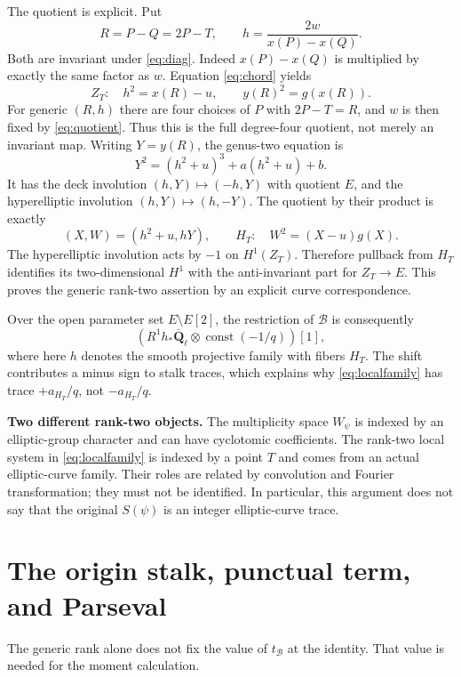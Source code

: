 \documentclass[11pt,a4paper]{article}
\numberwithin{equation}{section}
\newcommand{\Q}{\overline{\mathbf Q}_{\ell}}
\newcommand{\const}{\operatorname{const}}
\newcommand{\B}{\mathcal B}
\begin{document}
The quotient is explicit. Put
\begin{equation}\label{eq:quotient}
 R=P-Q=2P-T,\qquad h=\frac{2w}{x(P)-x(Q)}.
\end{equation}
Both are invariant under \eqref{eq:diag}. Indeed $x(P)-x(Q)$ is multiplied by exactly the same factor as $w$. Equation \eqref{eq:chord} yields
\begin{equation}\label{eq:genus2}
 Z_T:\quad h^2=x(R)-u,\qquad y(R)^2=g(x(R)).
\end{equation}
For generic $(R,h)$ there are four choices of $P$ with $2P-T=R$, and $w$ is then fixed by \eqref{eq:quotient}. Thus this is the full degree-four quotient, not merely an invariant map. Writing $Y=y(R)$, the genus-two equation is
\begin{equation}
 Y^2=(h^2+u)^3+a(h^2+u)+b.
\end{equation}
It has the deck involution $(h,Y)\mapsto(-h,Y)$ with quotient $E$, and the hyperelliptic involution $(h,Y)\mapsto(h,-Y)$. The quotient by their product is exactly
\begin{equation}
 (X,W)=(h^2+u,hY),\qquad H_T:\quad W^2=(X-u)g(X).
\end{equation}
The hyperelliptic involution acts by $-1$ on $H^1(Z_T)$. Therefore pullback from $H_T$ identifies its two-dimensional $H^1$ with the anti-invariant part for $Z_T\to E$. This proves the generic rank-two assertion by an explicit curve correspondence.

Over the open parameter set $E\setminus E[2]$, the restriction of $\B$ is consequently
\begin{equation}\label{eq:localfamily}
 \left(R^1h_*\Q\otimes\const(-1/q)\right)[1],
\end{equation}
where here $h$ denotes the smooth projective family with fibers $H_T$. The shift contributes a minus sign to stalk traces, which explains why \eqref{eq:localfamily} has trace $+a_{H_T}/q$, not $-a_{H_T}/q$.

\textbf{Two different rank-two objects.} The multiplicity space $W_\psi$ is indexed by an elliptic-group character and can have cyclotomic coefficients. The rank-two local system in \eqref{eq:localfamily} is indexed by a point $T$ and comes from an actual elliptic-curve family. Their roles are related by convolution and Fourier transformation; they must not be identified. In particular, this argument does not say that the original $S(\psi)$ is an integer elliptic-curve trace.

\section{The origin stalk, punctual term, and Parseval}
The generic rank alone does not fix the value of $t_{\B}$ at the identity. That value is needed for the moment calculation.
\end{document}
